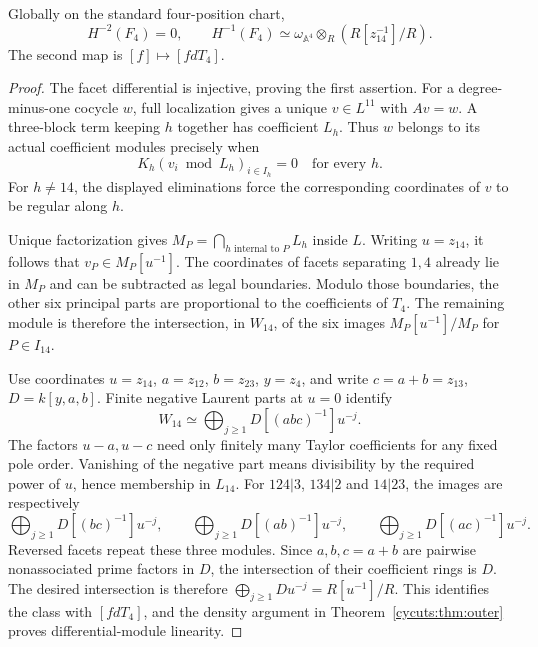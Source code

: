 \begin{theorem}\label{cycuts:thm:four-negative}
Globally on the standard four-position chart,
\begin{equation}\label{cycuts:eq:four-negative}
 H^{-2}(F_4)=0,\qquad
 H^{-1}(F_4)\simeq
 \omega_{\mathbb A^4}\otimes_R(R[z_{14}^{-1}]/R).
\end{equation}
The second map is $[f]\mapsto[fdT_4]$.
\end{theorem}
\begin{proof}
The facet differential is injective, proving the first assertion.
For a degree-minus-one cocycle $w$, full localization gives a unique
$v\in L^{11}$ with $Av=w$. A three-block term keeping $h$
together has coefficient $L_h$. Thus $w$ belongs to its actual
coefficient modules precisely when
\[
 K_h(v_i\bmod L_h)_{i\in I_h}=0\quad\text{for every }h.
\]
For $h\ne14$, the displayed eliminations force the corresponding
coordinates of $v$ to be regular along $h$.

Unique factorization gives
$M_P=\bigcap_{h\text{ internal to }P}L_h$ inside $L$.
Writing $u=z_{14}$, it follows that $v_P\in M_P[u^{-1}]$.
The coordinates of facets separating $1,4$ already lie in $M_P$
and can be subtracted as legal boundaries. Modulo those boundaries,
the other six principal parts are proportional to the coefficients
of $T_4$. The remaining module is therefore the intersection, in
$W_{14}$, of the six images $M_P[u^{-1}]/M_P$ for $P\in I_{14}$.

Use coordinates $u=z_{14}$, $a=z_{12}$, $b=z_{23}$, $y=z_4$,
and write $c=a+b=z_{13}$, $D=k[y,a,b]$. Finite negative Laurent
parts at $u=0$ identify
\[
 W_{14}\simeq\bigoplus_{j\ge1}D[(abc)^{-1}]u^{-j}.
\]
The factors $u-a,u-c$ need only finitely many Taylor coefficients
for any fixed pole order. Vanishing of the negative part means
divisibility by the required power of $u$, hence membership in $L_{14}$.
For $124|3$, $134|2$ and $14|23$, the images are respectively
\[
 \bigoplus_{j\ge1}D[(bc)^{-1}]u^{-j},\qquad
 \bigoplus_{j\ge1}D[(ab)^{-1}]u^{-j},\qquad
 \bigoplus_{j\ge1}D[(ac)^{-1}]u^{-j}.
\]
Reversed facets repeat these three modules. Since $a,b,c=a+b$
are pairwise nonassociated prime factors in $D$, the intersection
of their coefficient rings is $D$. The desired intersection is
therefore $\bigoplus_{j\ge1}Du^{-j}=R[u^{-1}]/R$.
This identifies the class with $[fdT_4]$, and the density argument
in Theorem~\ref{cycuts:thm:outer} proves differential-module linearity.
\end{proof}


